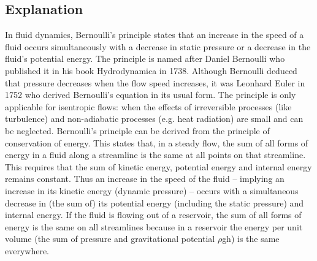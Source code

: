 \subsection{Explanation}
    In fluid dynamics, Bernoulli's principle states that an increase in the speed of a fluid occurs simultaneously with a decrease in static pressure or a decrease in the fluid's potential energy. The principle is named after Daniel Bernoulli who published it in his book Hydrodynamica in 1738. Although Bernoulli deduced that pressure decreases when the flow speed increases, it was Leonhard Euler in 1752 who derived Bernoulli's equation in its usual form. The principle is only applicable for isentropic flows: when the effects of irreversible processes (like turbulence) and non-adiabatic processes (e.g. heat radiation) are small and can be neglected.
    Bernoulli's principle can be derived from the principle of conservation of energy. This states that, in a steady flow, the sum of all forms of energy in a fluid along a streamline is the same at all points on that streamline. This requires that the sum of kinetic energy, potential energy and internal energy remains constant. Thus an increase in the speed of the fluid – implying an increase in its kinetic energy (dynamic pressure) – occurs with a simultaneous decrease in (the sum of) its potential energy (including the static pressure) and internal energy. If the fluid is flowing out of a reservoir, the sum of all forms of energy is the same on all streamlines because in a reservoir the energy per unit volume (the sum of pressure and gravitational potential $ \rho $gh) is the same everywhere.
